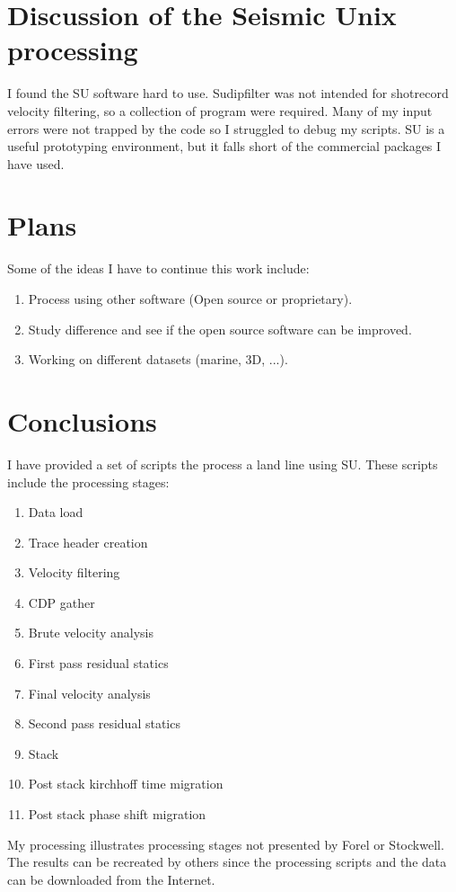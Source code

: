 \section{Discussion of the Seismic Unix processing}
I found the SU software hard to use.  Sudipfilter was not intended for 
shotrecord velocity filtering, so a collection of program were required.  
Many of my input errors were not trapped by the code so I struggled to 
debug my scripts.  SU is a useful prototyping environment, but it falls 
short of the commercial packages I have used.

\section{Plans}
Some of the ideas I have to continue this work include:

\begin{enumerate}
\item Process using other software (Open source or proprietary). 
\item Study difference and see if the open source software can be improved.
\item Working on different datasets (marine, 3D, ...).
\end{enumerate}

\section{Conclusions}
I have provided a set of scripts the process a land line using SU.  These scripts include the processing stages:

\begin{enumerate}
\item Data load
\item Trace header creation
\item Velocity filtering 
\item CDP gather
\item Brute velocity analysis
\item First pass residual statics
\item Final velocity analysis
\item Second pass residual statics
\item Stack
\item Post stack kirchhoff time migration
\item Post stack phase shift migration
\end{enumerate}

My processing illustrates processing stages not presented by Forel
or Stockwell. The results can be recreated by others since the processing
scripts and the data can be downloaded from the Internet.

